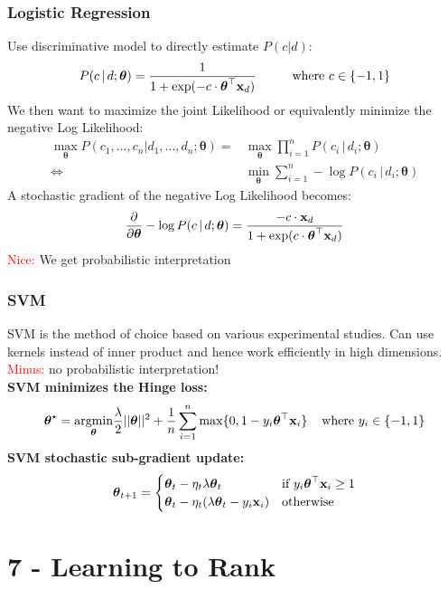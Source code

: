 \documentclass[a4paper,11pt]{article}
\newcommand{\msection}[1]{\section{#1}\vspace{-0.5mm}}
\newcommand{\btheta}{\boldsymbol \theta}
\begin{document}
\begin{multicols}{2}
\subsubsection{Logistic Regression}
Use discriminative model to directly estimate $P(c | d)$:
\begin{align*}
  P(c \, | \, d; \btheta) &= \frac{1}{1 + \exp(-c \cdot \btheta^\top \textbf x_d)} \hspace{1cm} \text{where } c \in \{-1, 1\}\\
\end{align*}
We then want to maximize the joint Likelihood or equivalently minimize the negative Log Likelihood:
\begin{align*}
  \max_{\btheta} P(c_1,...,c_n | d_1,...,d_n; \btheta) =& \max_{\btheta} \prod_{i = 1}^n P(c_i \, | \, d_i  ; \btheta) \\
  \Leftrightarrow& \min_{\btheta} \sum_{i=1}^n - \log P(c_i \, | \, d_i; \btheta)
\end{align*}
A stochastic gradient of the negative Log Likelihood becomes:
\[
  \frac{\partial}{\partial \btheta} - \log P(c \, | \, d ; \btheta) = \frac{-c \cdot \textbf x_d}{1 + \exp(c \cdot \btheta^{\top} \textbf x_d)}
\]
\textcolor{red}{Nice:} We get probabilistic interpretation

\subsubsection{SVM}
SVM is the method of choice based on various experimental studies. Can use kernels instead of inner product and hence work efficiently in high dimensions. \textcolor{red}{Minus:} no probabilistic interpretation!\\
\textbf{SVM minimizes the Hinge loss:}
\[
  \btheta^{\star} = \underset{\btheta}{\text{argmin}} \frac{\lambda}{2} ||\btheta||^2 + \frac{1}{n} \sum_{i = 1}^n \max\{0, 1 - y_i \btheta^{\top} \textbf x_i\} \hspace{0.4cm} \text{where } y_i \in \{-1, 1\}
\]
\textbf{SVM stochastic sub-gradient update:}
\[
  \btheta_{t+1} = 
                \begin{cases} 
                      \btheta_t - \eta_t \lambda \btheta_t & \text{if } y_i \btheta^{\top} \textbf x_i \geq 1\\ 
                      \btheta_t - \eta_t (\lambda \btheta_t - y_i \textbf x_i) & \text{otherwise}
                 \end{cases}
\]

\msection{7 - Learning to Rank}

\end{multicols}
\end{document}
